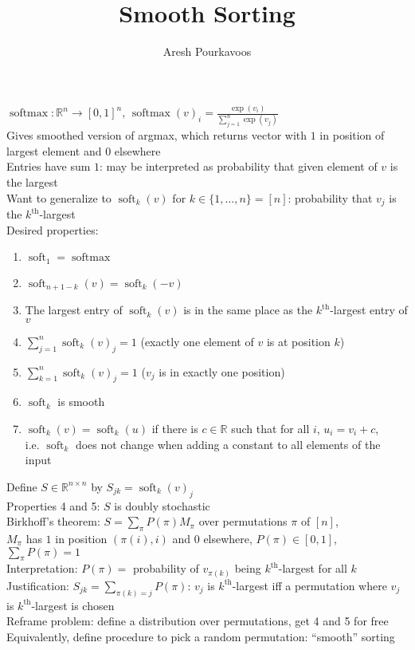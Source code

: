 \documentclass{article}
\newcommand{\R}{\mathbb{R}}
\DeclareMathOperator{\softmax}{softmax}
\DeclareMathOperator{\soft}{soft}
\begin{document}
\title{Smooth Sorting}
\author{Aresh Pourkavoos}
\maketitle

$\softmax: \R^n \rightarrow [0, 1]^n$,
$\softmax(v)_i = \frac{\exp(v_i)}{\sum_{j=1}^n \exp(v_j)}$ \\
Gives smoothed version of argmax,
which returns vector with $1$ in position of largest element
and $0$ elsewhere \\
Entries have sum $1$:
may be interpreted as probability that given element of $v$ is the largest \\
Want to generalize to $\soft_k(v)$ for $k \in \{1, \ldots, n\} = [n]$:
probability that $v_j$ is the $k^\text{th}$-largest \\
Desired properties:
\begin{enumerate}
\item
  $\soft_1 = \softmax$
\item
  $\soft_{n+1-k}(v) = \soft_k(-v)$
\item
  The largest entry of $\soft_k(v)$
  is in the same place as the $k^\text{th}$-largest entry of $v$
\item
  $\sum_{j=1}^n\soft_k(v)_j = 1$
  (exactly one element of $v$ is at position $k$)
\item
  $\sum_{k=1}^n\soft_k(v)_j = 1$
  ($v_j$ is in exactly one position)
\item
  $\soft_k$ is smooth
\item
  $\soft_k(v) = \soft_k(u)$ if there is $c \in \mathbb{R}$
  such that for all $i$, $u_i = v_i+c$, \\
  i.e. $\soft_k$ does not change when adding a constant to all elements of the input
\end{enumerate}
Define $S \in \R^{n \times n}$ by $S_{jk} = \soft_k(v)_j$ \\
Properties 4 and 5: $S$ is doubly stochastic \\
Birkhoff's theorem: $S = \sum_\pi P(\pi)M_\pi$ over permutations $\pi$ of $[n]$, \\
$M_\pi$ has $1$ in position $(\pi(i), i)$ and $0$ elsewhere,
$P(\pi) \in [0, 1]$, $\sum_\pi P(\pi)=1$ \\
Interpretation: $P(\pi)=$ probability of
$v_{\pi(k)}$ being $k^\text{th}$-largest for all $k$ \\
Justification: $S_{jk} = \sum_{\pi(k)=j}P(\pi)$:
$v_j$ is $k^\text{th}$-largest iff
a permutation where $v_j$ is $k^\text{th}$-largest is chosen \\
Reframe problem: define a distribution over permutations,
get 4 and 5 for free \\
Equivalently, define procedure to pick a random permutation:
``smooth'' sorting \\
\end{document}
